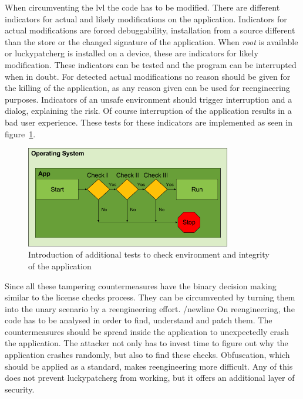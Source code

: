 When circumventing the \gls{lvl} the code has to be modified.
There are different indicators for actual and likely modifications on the application.
Indicators for actual modifications are forced debuggability, installation from a source different than the store or the changed signature of the application.
When \textit{root} is available or \gls{luckypatcherg} is installed on a device, these are indicators for likely modification.
\newline
These indicators can be tested and the program can be interrupted when in doubt.
For detected actual modifications no reason should be given for the killing of the application, as any reason given can be used for reengineering purposes.
Indicators of an unsafe environment should trigger interruption and a dialog, explaining the risk.
Of course interruption of the application results in a bad user experience.
\newline
These tests for these indicators are implemented as seen in figure~\ref{fig:verificationNowAdditional}.
\begin{figure}[h]
    \centering
    \includegraphics[width=0.8\textwidth]{data/verificationNowAdditional.png}
    \caption{Introduction of additional tests to check environment and integrity of the application}
    \label{fig:verificationNowAdditional}
\end{figure}
Since all these tampering countermeasures have the binary decision making similar to the license checks process.
They can be circumvented by turning them into the unary scenario by a reengineering effort.
/newline
On reengineering, the code has to be analysed in order to find, understand and patch them.
The countermeasures should be spread inside the application to unexpectedly crash the application.
The attacker not only has to invest time to figure out why the application crashes randomly, but also to find these checks.
Obfuscation, which should be applied as a standard, makes reengineering more difficult.
\newline
Any of this does not prevent \gls{luckypatcherg} from working, but it offers an additional layer of security.
